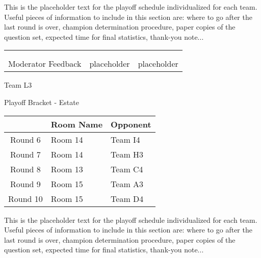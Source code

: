 \documentclass{article}%
\begin{document}
\vspace*{30pt}%
\linebreak%
This is the placeholder text for the playoff schedule individualized for each team. Useful pieces of information to include in this section are: where to go after the last round is over, champion determination procedure, paper copies of the question set, expected time for final statistics, thank{-}you note...%
\vspace*{30pt}%
\newline%
%
\begin{tabularx}{\textwidth}{YYY}%
  &  &  \\%
\\%
Moderator Feedback&placeholder&placeholder\\%
\end{tabularx}%
\newpage%
\begin{center}%
\begin{Huge}%
Team L3%
\end{Huge}%
\vspace*{12pt}%
\linebreak%
\begin{Large}%
Playoff Bracket {-} Estate%
\end{Large}%
\end{center}%
\vspace*{4pt}%
%
\begin{tabularx}{\textwidth}{|c|Y|Y|}%
\hline%
&Room Name&Opponent\\%
\hline%
Round 6&Room 14&Team I4\\%
Round 7&Room 14&Team H3\\%
Round 8&Room 13&Team C4\\%
Round 9&Room 15&Team A3\\%
Round 10&Room 15&Team D4\\%
\hline%
\end{tabularx}%
\vspace*{30pt}%
\linebreak%
This is the placeholder text for the playoff schedule individualized for each team. Useful pieces of information to include in this section are: where to go after the last round is over, champion determination procedure, paper copies of the question set, expected time for final statistics, thank{-}you note...%
\vspace*{30pt}%
\end{document}
